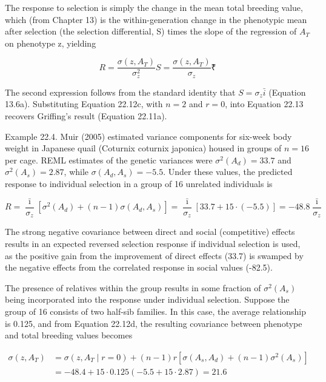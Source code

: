 \documentclass{article}
\begin{document}
The response to selection is simply the change in the mean total breeding value, which (from Chapter 13) is the within-generation change in the phenotypic mean after selection (the selection differential, S) times the slope of the regression of  $ A_{T} $ on phenotype z, yielding

\begin{equation}
R=\frac{\sigma(z,A_{T})}{\sigma_{z}^{2}}S=\frac{\sigma(z,A_{T})}{\sigma_{z}}₹
\tag{22.14}
\label{eq:22_14}
\end{equation}

The second expression follows from the standard identity that  $ S = \sigma_z \bar{i} $ (Equation 13.6a). Substituting Equation 22.12c, with  $ n = 2 $ and  $ r = 0 $, into Equation 22.13 recovers Griffing's result (Equation 22.11a).

Example 22.4. Muir (2005) estimated variance components for six-week body weight in Japanese quail (Coturnix coturnix japonica) housed in groups of $n = 16$ per cage. REML estimates of the genetic variances were $\sigma^2(A_d) = 33.7$ and $\sigma^2(A_s) = 2.87$, while $\sigma(A_d, A_s) = -5.5$. Under these values, the predicted response to individual selection in a group of 16 unrelated individuals is

\begin{equation}
R=\frac{\bar{\imath}}{\sigma_{z}}\left[\sigma^{2}(A_{d})+(n-1)\sigma(A_{d},A_{s})\right]=\frac{\bar{\imath}}{\sigma_{z}}\left[33.7+15\cdot(-5.5)\right]=-48.8\frac{\bar{\imath}}{\sigma_{z}}
\end{equation}

The strong negative covariance between direct and social (competitive) effects results in an expected reversed selection response if individual selection is used, as the positive gain from the improvement of direct effects (33.7) is swamped by the negative effects from the correlated response in social values (-82.5).

The presence of relatives within the group results in some fraction of  $ \sigma^{2}(A_{s}) $ being incorporated into the response under individual selection. Suppose the group of 16 consists of two half-sib families. In this case, the average relationship is 0.125, and from Equation 22.12d, the resulting covariance between phenotype and total breeding values becomes

\begin{equation}
\begin{aligned}\sigma(z,A_{T})&=\sigma(z,A_{T}\mid r=0)+(n-1)r\left[\sigma\left(A_{s},A_{d}\right)+(n-1)\sigma^{2}\left(A_{s}\right)\right]\\&=-48.4+15\cdot0.125\left(-5.5+15\cdot2.87\right)=21.6\end{aligned}
\end{equation}
\end{document}
